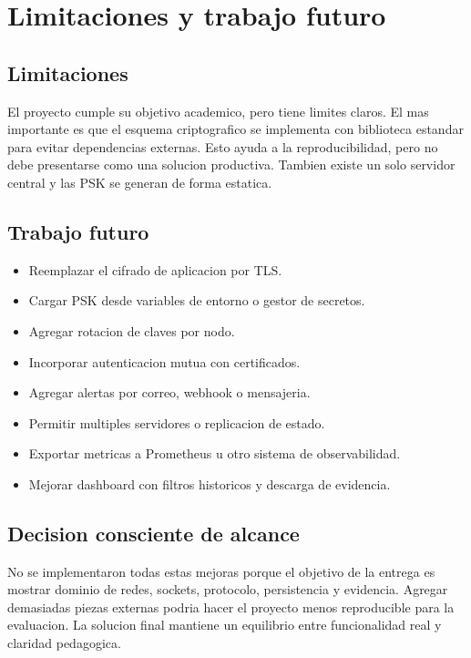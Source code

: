 \documentclass[11pt,letterpaper]{article}
\begin{document}
\newpage
\section{Limitaciones y trabajo futuro}

\subsection{Limitaciones}

El proyecto cumple su objetivo academico, pero tiene limites claros. El mas
importante es que el esquema criptografico se implementa con biblioteca estandar
para evitar dependencias externas. Esto ayuda a la reproducibilidad, pero no debe
presentarse como una solucion productiva. Tambien existe un solo servidor central
y las PSK se generan de forma estatica.

\subsection{Trabajo futuro}

\begin{itemize}
  \item Reemplazar el cifrado de aplicacion por TLS.
  \item Cargar PSK desde variables de entorno o gestor de secretos.
  \item Agregar rotacion de claves por nodo.
  \item Incorporar autenticacion mutua con certificados.
  \item Agregar alertas por correo, webhook o mensajeria.
  \item Permitir multiples servidores o replicacion de estado.
  \item Exportar metricas a Prometheus u otro sistema de observabilidad.
  \item Mejorar dashboard con filtros historicos y descarga de evidencia.
\end{itemize}

\subsection{Decision consciente de alcance}

No se implementaron todas estas mejoras porque el objetivo de la entrega es
mostrar dominio de redes, sockets, protocolo, persistencia y evidencia. Agregar
demasiadas piezas externas podria hacer el proyecto menos reproducible para la
evaluacion. La solucion final mantiene un equilibrio entre funcionalidad real y
claridad pedagogica.
\end{document}
